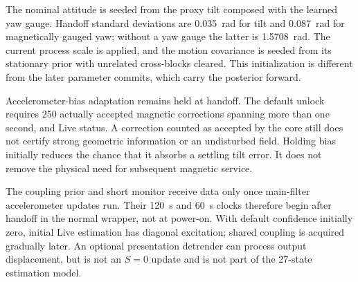 \documentclass[conference]{IEEEtran}
\begin{document}
The nominal attitude is seeded from the proxy tilt composed with the
learned yaw gauge. Handoff standard deviations are 0.035~rad for tilt and
0.087~rad for magnetically gauged yaw; without a yaw gauge the latter is
1.5708~rad. The current process scale is applied, and the motion covariance
is seeded from its stationary prior with unrelated cross-blocks cleared.
This initialization is different from the later parameter commits, which
carry the posterior forward.

Accelerometer-bias adaptation remains held at handoff. The default unlock
requires 250 actually accepted magnetic corrections spanning more than
one second, and Live status. A correction counted as accepted by the core
still does not certify strong geometric information or an undisturbed
field. Holding bias initially reduces the chance that it absorbs a
settling tilt error. It does not remove the physical need for subsequent
magnetic service.

The coupling prior and short monitor receive data only once main-filter
accelerometer updates run. Their 120~s and 60~s clocks therefore begin
after handoff in the normal wrapper, not at power-on. With default
confidence initially zero, initial Live estimation has diagonal excitation;
shared coupling is acquired gradually later. An optional presentation
detrender can process output displacement, but is not an $S=0$ update
and is not part of the 27-state estimation model.
\end{document}
